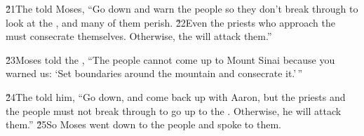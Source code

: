 \v{21}The  told Moses, ``Go down and warn the people so they don't break through to look at the , and many of them perish. \v{22}Even the priests who approach the  must consecrate themselves. Otherwise, the  will attack them.''

\v{23}Moses told the , ``The people cannot come up to Mount Sinai because you warned us: `Set boundaries around the mountain and consecrate it.'\,''

\v{24}The  told him, ``Go down, and come back up with Aaron, but the priests and the people must not break through to go up to the . Otherwise, he will attack them.'' \v{25}So Moses went down to the people and spoke to them.


